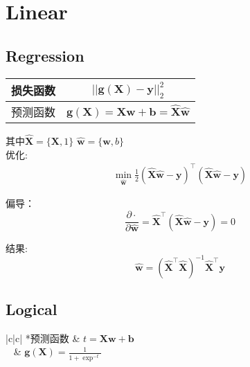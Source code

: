 \documentclass{ctexart}
\newcommand{\bb}[1]{\mathbf{#1}} %
\newcommand{\bmb}{\bb{b}}
\newcommand{\bmg}{\bb{g}}
\newcommand{\bmw}{\bb{w}}
\newcommand{\bmy}{\bb{y}}
\newcommand{\bmX}{\bb{X}}
\newcommand{\data}{\bmX}
\newcommand{\labels}{\bmy}
\newcommand{\wights}{\bmw}
\newcommand{\predict}{\bmg(\data)}
\newcommand{\bios}{\bmb}
\newcommand{\sqrtloss}[2]{||#1 - #2||^2_2}
\newcommand{\predictfunction}{预测函数}
\newcommand{\lossfunction}{损失函数}
\newcommand{\getmin}[2]{\min_{#1}{#2}}
\newcommand{\Partial}[2]{\frac{\partial #1}{\partial #2}}
\newcommand{\hX}{\hat{\data}}
\newcommand{\hw}{\hat{\wights}}
\newcommand{\sigmod}[1]{\frac{1}{1 + \exp^{-#1}}}
\begin{document}
\section{Linear}
\subsection{Regression}
\begin{center}
\begin{tabular}{|c|c|}
    \hline
    \lossfunction & $\sqrtloss{\predict}{\labels}$ \\ \hline
    \predictfunction & $\predict = \data \wights + \bios = \hX \hw$ \\ \hline
\end{tabular}    
\end{center}

其中$\hX = \{\data,1\}$ $\hw = \{\wights,b\}$\\

优化:
\begin{gather}
    \getmin{\hw}{\frac{1}{2}(\hX \hw - \labels)^\top(\hX \hw - \labels)}
\end{gather}

偏导：
\begin{equation}
    \Partial{\cdot }{\hw} = \hX^\top (\hX \hw - \labels) = 0
\end{equation}

结果:
\begin{equation}
    \hw = (\hX^\top \hX)^{-1} \hX^\top \labels
\end{equation}

\subsection{Logical}
\begin{center}
    \begin{tabular}{|c|c|}
        \hline
        *{\predictfunction} & $t = \data \wights + \bios $ \\ 
        ~ & $\predict = \sigmod{t}$ \\ \hline
    \end{tabular}    
\end{center}
\end{document}
